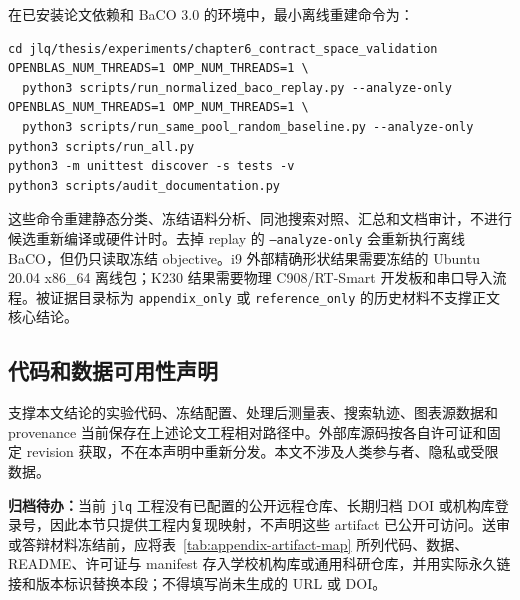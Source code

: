 \begin{thesisappendix}
在已安装论文依赖和 BaCO 3.0 的环境中，最小离线重建命令为：

\begin{verbatim}
cd jlq/thesis/experiments/chapter6_contract_space_validation
OPENBLAS_NUM_THREADS=1 OMP_NUM_THREADS=1 \
  python3 scripts/run_normalized_baco_replay.py --analyze-only
OPENBLAS_NUM_THREADS=1 OMP_NUM_THREADS=1 \
  python3 scripts/run_same_pool_random_baseline.py --analyze-only
python3 scripts/run_all.py
python3 -m unittest discover -s tests -v
python3 scripts/audit_documentation.py
\end{verbatim}

这些命令重建静态分类、冻结语料分析、同池搜索对照、汇总和文档审计，不进行候选重新编译或硬件计时。去掉 replay 的 \texttt{--analyze-only} 会重新执行离线 BaCO，但仍只读取冻结 objective。i9 外部精确形状结果需要冻结的 Ubuntu 20.04 x86\_64 离线包；K230 结果需要物理 C908/RT-Smart 开发板和串口导入流程。被证据目录标为 \texttt{appendix\_only} 或 \texttt{reference\_only} 的历史材料不支撑正文核心结论。

\subsection{代码和数据可用性声明}

支撑本文结论的实验代码、冻结配置、处理后测量表、搜索轨迹、图表源数据和 provenance 当前保存在上述论文工程相对路径中。外部库源码按各自许可证和固定 revision 获取，不在本声明中重新分发。本文不涉及人类参与者、隐私或受限数据。

\textbf{归档待办：}当前 \texttt{jlq} 工程没有已配置的公开远程仓库、长期归档 DOI 或机构库登录号，因此本节只提供工程内复现映射，不声明这些 artifact 已公开可访问。送审或答辩材料冻结前，应将表~\ref{tab:appendix-artifact-map} 所列代码、数据、README、许可证与 manifest 存入学校机构库或通用科研仓库，并用实际永久链接和版本标识替换本段；不得填写尚未生成的 URL 或 DOI。

\end{thesisappendix}
